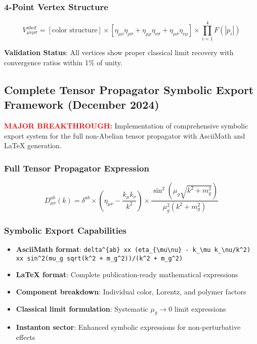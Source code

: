 \documentclass[11pt]{article}
\begin{document}
\subsubsection*{4-Point Vertex Structure}
\[
  V^{abcd}_{\mu\nu\rho\sigma} = [\text{color structure}] \times [\eta_{\mu\nu}\eta_{\rho\sigma} + \eta_{\mu\rho}\eta_{\nu\sigma} + \eta_{\mu\sigma}\eta_{\nu\rho}] \times \prod_{i=1}^4 F(|p_i|)
\]

\textbf{Validation Status}: All vertices show proper classical limit recovery with convergence ratios within 1\% of unity.

\subsection*{Complete Tensor Propagator Symbolic Export Framework (December 2024)}

\textcolor{red}{\textbf{MAJOR BREAKTHROUGH:}} Implementation of comprehensive symbolic export system for the full non-Abelian tensor propagator with AsciiMath and LaTeX generation.

\subsubsection*{Full Tensor Propagator Expression}
\[
  \boxed{D^{ab}_{\mu\nu}(k) = \delta^{ab} \times \left(\eta_{\mu\nu} - \frac{k_\mu k_\nu}{k^2}\right) \times \frac{\sin^2(\mu_g\sqrt{k^2 + m_g^2})}{\mu_g^2(k^2 + m_g^2)}}
\]

\subsubsection*{Symbolic Export Capabilities}
\begin{itemize}
  \item \textbf{AsciiMath format}: \texttt{delta\^{}\{ab\} xx (eta\_\{\textbackslash{}mu\textbackslash{}nu\} - k\_\textbackslash{}mu k\_\textbackslash{}nu/k\^{}2) xx sin\^{}2(mu\_g sqrt(k\^{}2 + m\_g\^{}2))/(k\^{}2 + m\_g\^{}2)}
  \item \textbf{LaTeX format}: Complete publication-ready mathematical expressions
  \item \textbf{Component breakdown}: Individual color, Lorentz, and polymer factors
  \item \textbf{Classical limit formulation}: Systematic $\mu_g \to 0$ limit expressions
  \item \textbf{Instanton sector}: Enhanced symbolic expressions for non-perturbative effects
\end{itemize}
\end{document}
